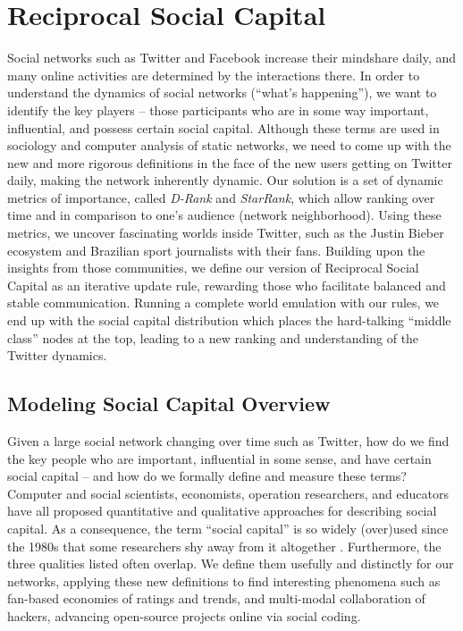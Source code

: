 \documentclass[10pt,oneside]{memoir}
\begin{document}
\chapter{Reciprocal Social Capital}
\label{reciprocalsocialcapital}

\label{chapter:social-capital}


Social networks such as Twitter and Facebook increase their mindshare daily, and many online activities are determined by the interactions there. In order to understand the dynamics of social networks (``what's happening''), we want to identify the key players -- those participants who are in some way important, influential, and possess certain social capital. Although these terms are used in sociology and computer analysis of static networks, we need to come up with the new and more rigorous definitions in the face of the new users getting on Twitter daily, making the network inherently dynamic. Our solution is a set of dynamic metrics of importance, called {\itshape D-Rank} and {\itshape StarRank}, which allow ranking over time and in comparison to one's audience (network neighborhood). Using these metrics, we uncover fascinating worlds inside Twitter, such as the Justin Bieber ecosystem and Brazilian sport journalists with their fans. Building upon the insights from those communities, we define our version of Reciprocal Social Capital as an iterative update rule, rewarding those who facilitate balanced and stable communication. Running a complete world emulation with our rules, we end up with the social capital distribution which places the hard-talking ``middle class'' nodes at the top, leading to a new ranking and understanding of the Twitter dynamics.


\pagebreak \section{Modeling Social Capital Overview}
\label{modelingsocialcapitaloverview}

Given a large social network changing over time such as Twitter, how do we find the key people who are important, influential in some sense, and have certain social capital -- and how do we formally define and measure these terms? Computer and social scientists, economists, operation researchers, and educators have all proposed quantitative and qualitative approaches for describing social capital. As a consequence, the term ``social capital'' is so widely (over)used since the 1980s that some researchers shy away from it altogether \cite{jackson2008social}. Furthermore, the three qualities listed often overlap. We define them usefully and distinctly for our networks, applying these new definitions to find interesting phenomena such as fan-based economies of ratings and trends, and multi-modal collaboration of hackers, advancing open-source projects online via social coding.
\end{document}

